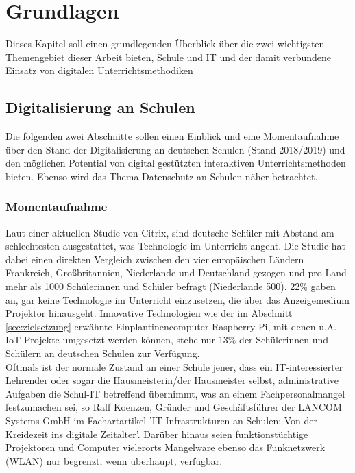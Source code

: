 \section{Grundlagen}\label{sec:grundlagen}
Dieses Kapitel soll einen grundlegenden Überblick über die zwei wichtigsten Themengebiet dieser Arbeit bieten, Schule und IT und der damit verbundene Einsatz von digitalen Unterrichtsmethodiken
\subsection{Digitalisierung an Schulen}\label{sec:digianschulen}
Die folgenden zwei Abschnitte sollen einen Einblick und eine Momentaufnahme über den Stand der Digitalisierung an deutschen Schulen (Stand 2018/2019) und den möglichen Potential von digital gestützten interaktiven Unterrichtsmethoden bieten. Ebenso wird das Thema Datenschutz an Schulen näher betrachtet.

\subsubsection{Momentaufnahme}\label{sec:technikunterricht}
Laut einer aktuellen Studie von Citrix, sind deutsche Schüler mit Abstand am schlechtesten 
ausgestattet, was Technologie im Unterricht angeht\cite{Technisc27:online}. Die Studie hat dabei einen direkten Vergleich zwischen den vier europäischen Ländern Frankreich, Großbritannien, Niederlande und Deutschland gezogen und pro Land mehr als 1000 Schülerinnen und Schüler befragt (Niederlande 500). 22\% gaben an, gar keine Technologie im Unterricht einzusetzen, die über das Anzeigemedium Projektor hinausgeht. Innovative Technologien wie der im Abschnitt \ref{sec:zielsetzung} erwähnte Einplantinencomputer Raspberry Pi, mit denen u.A. IoT-Projekte umgesetzt werden können, stehe nur 13\% der Schülerinnen und Schülern an deutschen Schulen zur Verfügung. \\ 
Oftmals ist der normale Zustand an einer Schule jener, dass ein IT-interessierter Lehrender oder sogar die Hausmeisterin/der Hausmeister selbst, administrative Aufgaben die Schul-IT betreffend übernimmt, was an einem Fachpersonalmangel festzumachen sei, so Ralf Koenzen, Gründer und Geschäftsführer der LANCOM Systems GmbH im Fachartartikel 'IT-Infrastrukturen an Schulen: Von der Kreidezeit ins digitale Zeitalter'\cite{Koenzen2018}. Darüber hinaus seien funktionstüchtige Projektoren und Computer vielerorts Mangelware ebenso das Funknetzwerk (WLAN) nur begrenzt, wenn überhaupt, verfügbar. 

